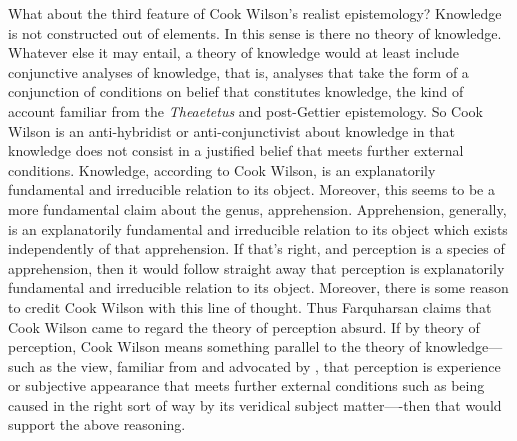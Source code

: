 \documentclass[12pt]{article}
\begin{document}
What about the third feature of Cook Wilson's realist epistemology? Knowledge is not constructed out of elements. In this sense is there no theory of knowledge. Whatever else it may entail, a theory of knowledge would at least include conjunctive analyses of knowledge, that is, analyses that take the form of a conjunction of conditions on belief that constitutes knowledge, the kind of account familiar from the \emph{Theaetetus} and post-Gettier epistemology. So Cook Wilson is an anti-hybridist or anti-conjunctivist about knowledge in that knowledge does not consist in a justified belief that meets further external conditions. Knowledge, according to Cook Wilson, is an explanatorily fundamental and irreducible relation to its object. Moreover, this seems to be a more fundamental claim about the genus, apprehension. Apprehension, generally, is an explanatorily fundamental and irreducible relation to its object which exists independently of that apprehension. If that's right, and perception is a species of apprehension, then it would follow straight away that perception is explanatorily fundamental and irreducible relation to its object. Moreover, there is some reason to credit Cook Wilson with this line of thought. Thus Farquharsan claims that Cook Wilson came to regard the theory of perception absurd. If by theory of perception, Cook Wilson means something parallel to the theory of knowledge---such as the view, familiar from \citet{Grice:1962jw} and advocated by \citet{Hobbes:1651fk}, that perception is experience or subjective appearance that meets further external conditions such as being caused in the right sort of way by its veridical subject matter----then that would support the above reasoning. 
\end{document}
